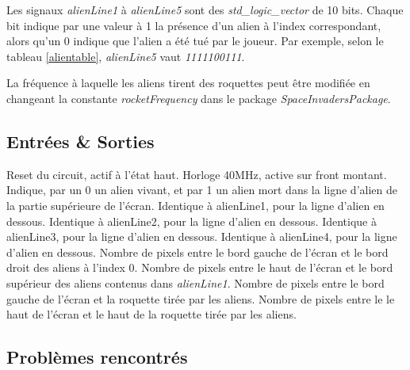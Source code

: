 \documentclass[french]{nakrule}
\begin{document}
Les signaux \emph{alienLine1} à \emph{alienLine5} sont des
\emph{std\_logic\_vector} de 10 bits. Chaque bit indique par une valeur à 1 la
présence d'un alien à l'index correspondant, alors qu'un 0 indique que l'alien a
été tué par le joueur. Par exemple, selon le tableau \ref{alientable},
\emph{alienLine5} vaut \emph{1111100111}.

La fréquence à laquelle les aliens tirent des roquettes peut être modifiée en
changeant la constante \emph{rocketFrequency} dans le package \emph{SpaceInvadersPackage}.

\clearpage

\subsection{Entrées \& Sorties}
\label{subsec:Entrees_Sorties_alienRocket}

\begin{descr}
   Reset du circuit, actif à l'état haut.
   Horloge 40MHz, active sur front montant.
   Indique, par un 0 un alien vivant, et par 1 un alien
  mort dans la ligne d'alien de la partie supérieure de l'écran.
   Identique à alienLine1, pour la ligne d'alien en dessous.
   Identique à alienLine2, pour la ligne d'alien en dessous.
   Identique à alienLine3, pour la ligne d'alien en dessous.
   Identique à alienLine4, pour la ligne d'alien en dessous.
   Nombre de pixels entre le bord gauche de l'écran et le
  bord droit des aliens à l'index 0.
   Nombre de pixels entre le haut de l'écran et le bord
  supérieur des aliens contenus dans \emph{alienLine1}.
   Nombre de pixels entre le bord gauche de l'écran et
  la roquette tirée par les aliens.
   Nombre de pixels entre le le haut de l'écran et le
  haut de la roquette tirée par les aliens.
\end{descr}

\subsection{Problèmes rencontrés}
\label{subsec:Problemes_rencontres_alienRocket}
\end{document}
